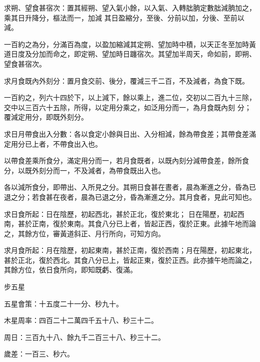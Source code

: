 \begin{pinyinscope}
 求朔、望食甚宿次：置其經朔、望入氣小餘，以入氣、入轉朏朒定數朏減朒加之，乘其日升降分，樞法而一，加減
 其日盈縮分，至後、分前以加，分後、至前以減。



 一百約之為分，分滿百為度，以盈加縮減其定朔、望加時中積，以天正冬至加時黃道日度及分加而命之，即定朔、望加時日躔宿次。其望加半周天，命如前，即朔、望食甚宿次。



 求月食既內外刻分：置月食交前、後分，覆減三千二百，不及減者，為食下既。



 一百約之，列六十四於下，以上減下，餘以乘上，進二位，交初以二百九十三除，交中以三百六十五除，所得，以定用分乘之，如泛用分而一，為月食既內刻
 分；覆減定用分，即既外刻分。



 求日月帶食出入分數：各以食定小餘與日出、入分相減，餘為帶食差；其帶食差滿定用分已上者，不帶食出入也。



 以帶食差乘所食分，滿定用分而一，若月食既者，以既內刻分減帶食差，餘所食分，以既外刻分而一，不及減者，為帶食既出入也。



 各以減所食分，即帶出、入所見之分。其朔日食甚在晝者，晨為漸進之分，昏為已退之分；若食甚在夜者，晨為已退之分，昏為漸進之分。其月食者，見此可知也。



 求日食所起：日在陰歷，初起西北，甚於正北，復於東北；
 日在陽歷，初起西南，甚於正南，復於東南。其食八分已上者，皆起正西，復於正東。此據午地而論之，其餘方位，審黃道斜正、月行所向，可知方向。



 求月食所起：月在陰歷，初起東南，甚於正南，復於西南；月在陽歷，初起東北，甚於正北，復於西北。其食八分已上，皆起正東，復於正西。此亦據午地而論之，其餘方位，依日食所向，即知既虧、復滿。



 步五星



 五星會策：十五度二十一分、秒九十。



 木星周率：四百二十二萬四千五十八、秒三十二。



 周日：三百九十八、餘九千二百三十八、秒三十二。



 歲差：一百三、秒六。




\end{pinyinscope}
